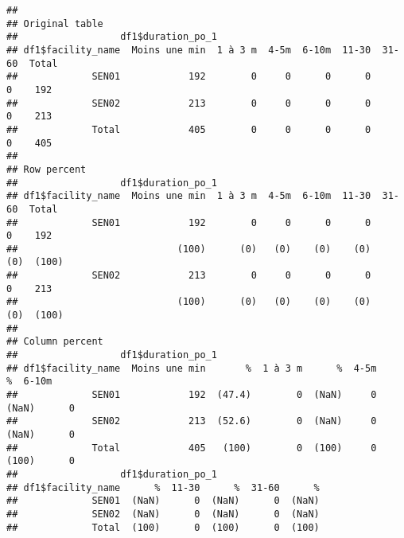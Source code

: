 \documentclass[
]{article}
\begin{document}
\begin{verbatim}
## 
## Original table 
##                  df1$duration_po_1
## df1$facility_name  Moins une min  1 à 3 m  4-5m  6-10m  11-30  31-60  Total
##             SEN01            192        0     0      0      0      0    192
##             SEN02            213        0     0      0      0      0    213
##             Total            405        0     0      0      0      0    405
## 
## Row percent 
##                  df1$duration_po_1
## df1$facility_name  Moins une min  1 à 3 m  4-5m  6-10m  11-30  31-60  Total
##             SEN01            192        0     0      0      0      0    192
##                            (100)      (0)   (0)    (0)    (0)    (0)  (100)
##             SEN02            213        0     0      0      0      0    213
##                            (100)      (0)   (0)    (0)    (0)    (0)  (100)
## 
## Column percent 
##                  df1$duration_po_1
## df1$facility_name  Moins une min       %  1 à 3 m      %  4-5m      %  6-10m
##             SEN01            192  (47.4)        0  (NaN)     0  (NaN)      0
##             SEN02            213  (52.6)        0  (NaN)     0  (NaN)      0
##             Total            405   (100)        0  (100)     0  (100)      0
##                  df1$duration_po_1
## df1$facility_name      %  11-30      %  31-60      %
##             SEN01  (NaN)      0  (NaN)      0  (NaN)
##             SEN02  (NaN)      0  (NaN)      0  (NaN)
##             Total  (100)      0  (100)      0  (100)
\end{verbatim}
\end{document}
